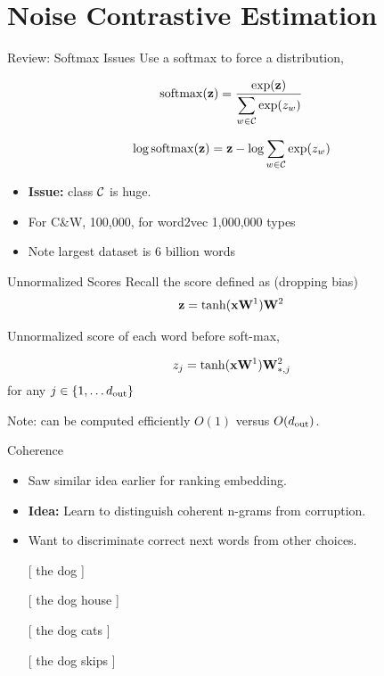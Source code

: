 \documentclass{beamer}
\begin{document}
\section{Noise Contrastive Estimation}

\begin{frame}{Review: Softmax Issues}
  Use a softmax to force a distribution,

  \[\softmax(\boldz) = \frac{\exp(\boldz)}{\displaystyle \sum_{w\in \mcC } \exp(z_w)}  \]

  \[\log \softmax(\boldz) = \boldz - \log \sum_{w\in \mcC} \exp(z_w)  \]

  \begin{itemize}
  \item \textbf{Issue:} class $\mathcal{C}$ is huge.
  \item For C\&W, 100,000, for word2vec 1,000,000 types
  \item Note largest dataset is 6 billion words
  \end{itemize}

\end{frame}



\begin{frame}{Unnormalized Scores}
  Recall the score defined as (dropping bias) 
  \[ \mathbf{z} = \tanh(\mathbf{x} \mathbf{W}^1)\mathbf{W}^2  \] 

  Unnormalized score of each word before soft-max, 

  \[ z_j = \tanh(\mathbf{x} \mathbf{W}^1)\mathbf{W}^2_{*,j}  \] 
  for any  $j \in \{1, \ldots {d_{\mathrm{out}}}\}$
  \air 

  Note: can be computed efficiently $O(1)$ versus $O({d_{\mathrm{out}}})$. 
\end{frame}


\begin{frame}{Coherence }
  \begin{itemize}
  \item Saw similar idea earlier for ranking embedding. 
    \air 

  \item \textbf{Idea:} Learn to distinguish coherent n-grams from 
    corruption. 
    \air 
 

    \air
  \item Want to discriminate correct next words from other choices.

    \begin{center}
      [ the dog  ]
    \end{center}
    
    
    

    \begin {center}
      [ the dog \alert{house}  ]
      
      [ the dog \alert{cats}  ]
      
      [ the dog \alert{skips}  ]
      
    \end{center}
  \end{itemize}
\end{frame}
\end{document}
